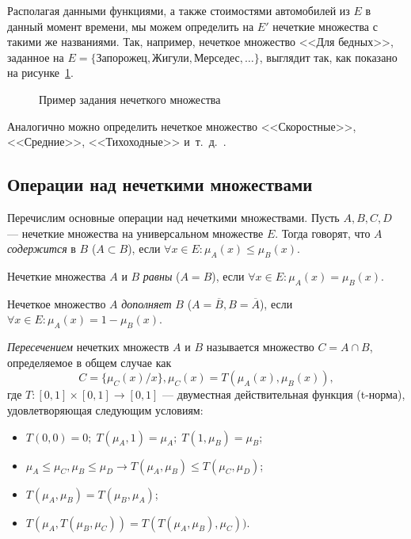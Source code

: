 Располагая данными функциями, а также стоимостями автомобилей из \( E \) в
данный момент времени, мы можем определить на \( E' \) нечеткие множества
с такими же названиями. Так, например, нечеткое множество <<Для бедных>>,
заданное на \( E = \{ \text{Запорожец}, \text{Жигули}, \text{Мерседес}, \ldots \} \),
выглядит так, как показано на рисунке~\ref{fig:example_set}.

\begin{figure}[h!]
  \centering
  \caption{Пример задания нечеткого множества}
  \label{fig:example_set}
\end{figure}

Аналогично можно определить нечеткое множество
<<Скоростные>>, <<Средние>>, <<Тихоходные>> и~т.~д.~\cite{kruglov2001}.

\pagebreak

\subsection{Операции над нечеткими множествами}

Перечислим основные операции над нечеткими множествами.
Пусть \( A, B, C, D \) --- нечеткие множества на универсальном множестве \( E \).
Тогда говорят, что \( A \) \emph{содержится} в \( B \) (\( A \subset B \)),
если \( \forall x \in E: \mu_A(x) \le \mu_B(x) \).

Нечеткие множества \( A \) и \( B \) \emph{равны} (\( A = B \)), если
\( \forall x \in E: \mu_A(x) = \mu_B(x) \).

Нечеткое множество \( A \) \emph{дополняет} \( B \) (\( A = \overline{B}, B = \overline{A} \)),
если \( \forall x \in E: \mu_A(x) = 1 - \mu_B(x) \).

\emph{Пересечением} нечетких множеств \( A \) и \( B \) называется множество
\( C = A \cap B \), определяемое в общем случае как
\[ C = \{ \mu_C(x) / x \}, \mu_C(x) = T(\mu_A(x), \mu_B(x)), \]
где \( T: [0, 1] \times [0,1] \rightarrow [0, 1] \) ---
двуместная действительная функция (t-норма), удовлетворяющая следующим условиям:
\begin{itemize}
\item \( T(0, 0) = 0; \; T(\mu_A, 1) = \mu_A; \; T(1, \mu_B) = \mu_B \);
\item \( \mu_A \le \mu_C, \mu_B \le \mu_D \rightarrow T(\mu_A, \mu_B) \le T(\mu_C, \mu_D) \);
\item \( T(\mu_A, \mu_B) = T(\mu_B, \mu_A) \);
\item \( T(\mu_A, T(\mu_B, \mu_C)) = T(T(\mu_A, \mu_B), \mu_C)) \).
\end{itemize}

